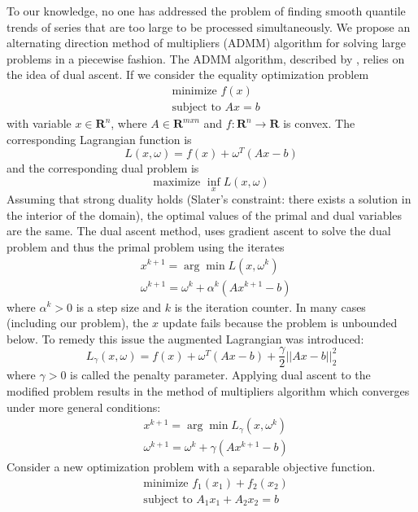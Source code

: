 \documentclass[12pt]{article}
\numberwithin{equation}{section}
\theoremstyle{plain}
\begin{document}
To our knowledge, no one has addressed the problem of finding smooth quantile trends of series that are too large to be processed simultaneously. We propose an alternating direction method of multipliers (ADMM) algorithm for solving large problems in a piecewise fashion. The ADMM algorithm, described by \cite{boyd2011distributed}, relies on the idea of dual ascent. If we consider the equality optimization problem 
\begin{align}
&\text{minimize } f(x)\\
&\text{subject to } Ax = b
\end{align}
with variable $x\in \mathbf{R}^n$, where $A \in \mathbf{R}^{mxn}$ and $f: \mathbf{R}^n \rightarrow \mathbf{R}$ is convex. The corresponding Lagrangian function is 
\begin{equation}
L(x,\omega) = f(x) + \omega^T(Ax-b)
\end{equation}
and the corresponding dual problem  is 
\begin{equation}
 \text{maximize } \inf_x L(x,\omega)
\end{equation}
Assuming that strong duality holds (Slater's constraint: there exists a solution in the interior of the domain), the optimal values of the primal and dual variables are the same. The dual ascent method, uses gradient ascent to solve the dual problem and thus the primal problem using the iterates
\begin{align}
&x^{k+1} = \arg\min L(x, \omega^k)\\
&\omega^{k+1} = \omega^k + \alpha^k(Ax^{k+1} - b)
\end{align}
where $\alpha^k > 0$ is a step size and $k$ is the iteration counter. In many cases (including our problem), the $x$ update fails because the problem is unbounded below. To remedy this issue the augmented Lagrangian was introduced:
\begin{equation}
L_{\gamma}(x,\omega) = f(x)+\omega^T(Ax-b) + \frac{\gamma}{2}||Ax-b||_2^2
\end{equation}
where $\gamma > 0$ is called the penalty parameter. Applying dual ascent to the modified problem results in the method of multipliers algorithm which converges under more general conditions:
\begin{align}
&x^{k+1} = \arg\min L_\gamma(x, \omega^k)\\
&\omega^{k+1} = \omega^k + \gamma(Ax^{k+1} - b)
\end{align}
Consider a new optimization problem with a separable objective function. 
\begin{align}
&\text{minimize } f_1(x_1) + f_2(x_2)\\
&\text{subject to } A_1x_1 + A_2x_2 = b
\end{align}
\end{document}
